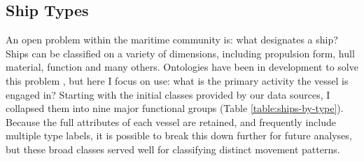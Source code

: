 \subsection{Ship Types}







An open problem within the maritime community is: what designates a ship? Ships can be classified on a variety of dimensions, including propulsion form, hull material, function and many others. Ontologies have been in development to solve this problem \citep{Vries2009}, but here I focus on use: what is the primary activity the vessel is engaged in? Starting with the initial classes provided by our data sources, I collapsed them into nine major functional groups (Table \ref{table:ships-by-type}). Because the full attributes of each vessel are retained, and frequently include multiple type labels, it is possible to break this down further for future analyses, but these broad classes served well for classifying distinct movement patterns.


